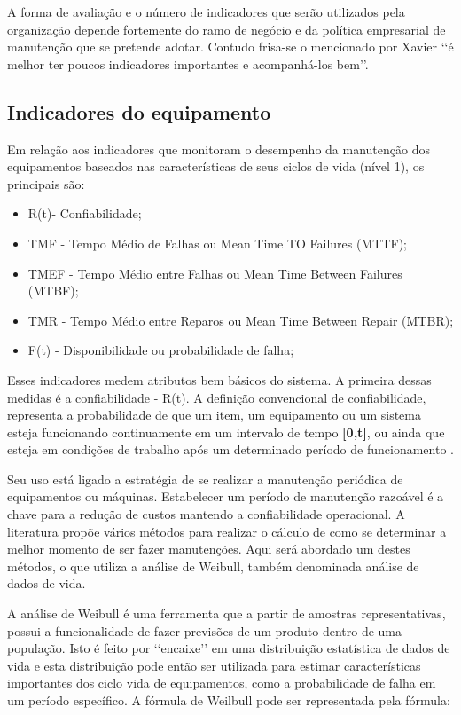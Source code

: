 A forma de avaliação e o número de indicadores que serão utilizados pela organização depende fortemente do ramo de negócio e da política empresarial de manutenção que se pretende adotar. Contudo frisa-se o mencionado por Xavier \cite{xavier2007indicadores} \lq\lq é melhor ter poucos indicadores importantes e acompanhá-los bem\rq\rq.

\subsection{Indicadores do equipamento}
\label{nivel 1}

Em relação aos indicadores que monitoram o desempenho da manutenção dos equipamentos baseados nas características de seus ciclos de vida (nível 1), os principais são:

\begin{itemize}
	\item R(t)- Confiabilidade;
	\item TMF - Tempo Médio de Falhas ou Mean Time TO Failures (MTTF);
	\item TMEF - Tempo Médio entre Falhas ou Mean Time Between Failures (MTBF);
	\item TMR - Tempo Médio entre Reparos ou Mean Time Between Repair (MTBR);
	\item F(t) - Disponibilidade ou probabilidade de falha;
	\end{itemize}

Esses indicadores medem atributos bem básicos do sistema. A primeira dessas medidas é a confiabilidade - R(t). A definição convencional de confiabilidade, representa a probabilidade de que um item, um equipamento ou um sistema esteja funcionando continuamente em um intervalo de tempo \textbf{[0,t]}, ou ainda que esteja em condições de trabalho após um determinado período de funcionamento \cite{tavares1999administraccao}. 

Seu uso está ligado a estratégia de se realizar a manutenção periódica de equipamentos ou máquinas. Estabelecer um período de manutenção razoável é a chave para a redução de custos mantendo a confiabilidade operacional. A literatura propõe vários métodos para realizar o cálculo de como se determinar a melhor momento de ser fazer manutenções. Aqui será abordado um destes métodos, o que utiliza a análise de Weibull, também denominada análise de dados de vida.

A análise de Weibull é uma ferramenta que a partir de amostras representativas, possui a funcionalidade de fazer previsões de um produto dentro de uma população.  Isto é feito por {\lq\lq encaixe\rq\rq} em uma distribuição estatística de dados de vida e esta distribuição pode então ser utilizada para estimar características importantes dos ciclo vida de equipamentos, como a probabilidade de falha em um período específico. A fórmula de Weilbull pode ser representada pela fórmula:

